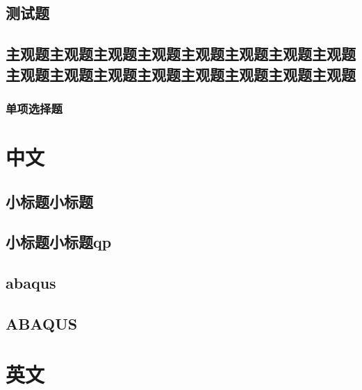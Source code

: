 \documentclass[color=blue]{textbook-cn}%
\begin{document}
\begin{Test}
\chapter{测试题}


\begin{Definition}[定义名称]
	\lipsum[2]
\end{Definition}

\section[主观题]{主观题主观题主观题主观题主观题主观题主观题主观题主观题主观题主观题主观题主观题主观题主观题主观题}




\subsection{单项选择题}

\lipsum

\end{Test}



\begin{Appendix}
\chapter[WWWW]{中文}

\section[子附录测试]{小标题小标题}
\section[子附录测试]{小标题小标题qp}

\section[子附录测试]{abaqus}


\section[子附录测试]{ABAQUS}


\zhlipsum
	
\chapter{英文}
\zhlipsum
\end{Appendix}
\end{document}
